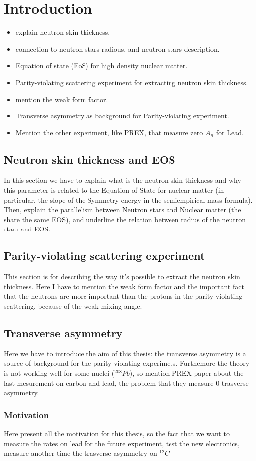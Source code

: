 
\chapter{Introduction} \label{intro} 

\begin{itemize}
\item explain neutron skin thickness.
\item connection to neutron stars radious, and neutron stars description.
\item Equation of state (EoS) for high density nuclear matter.
\item Parity-violating scattering experiment for extracting neutron skin thickness.
\item mention the weak form factor.
\item Transverse asymmetry as background for Parity-violating experiment. 
\item Mention the other experiment, like PREX, that measure zero $A_{n}$ for Lead.
\end{itemize}

\section{Neutron skin thickness and EOS}

In this section we have to explain what is the neutron skin thickness and why this parameter is related to the Equation of State for nuclear matter (in particular, the slope of the Symmetry energy in the semiempirical mass formula). Then, explain the parallelism between Neutron stars and Nuclear matter (the share the same EOS), and underline the relation between radius of the neutron stars and EOS.

\section{Parity-violating scattering experiment}

This section is for describing the way it's possible to extract the neutron skin thickness. Here I have to mention the weak form factor and the important fact that the neutrons are more important than the protons in the parity-violating scattering, because of the weak mixing angle.

\section{Transverse asymmetry}

Here we have to introduce the aim of this thesis: the transverse asymmetry is a source of background for the parity-violating experimets. Furthemore the theory is not working well for some nuclei ($^{208}Pb$), so mention PREX paper about the last mesurement on carbon and lead, the problem that they measure $0$ trasverse asymmetry.

\subsection{Motivation}
Here present all the motivation for this thesis, so the fact that we want to measure the rates on lead for the future experiment, test the new electronics, measure another time the trasverse asymmetry on $^{12}C$